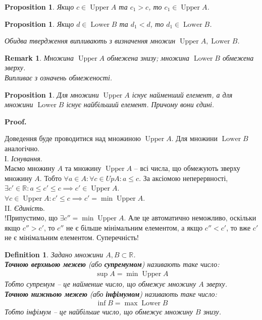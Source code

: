 \documentclass[a4paper, 14pt]{article}
\makeatletter
\def\qed{$\blacksquare$}
\theoremstyle{theoremdd}
\theoremstyle{theoremdd}
\newtheorem{definition}[theorem]{Definition}
\theoremstyle{theoremdd}
\theoremstyle{theoremdd}
\theoremstyle{theoremdd}
\newtheorem{proposition}[theorem]{Proposition}
\theoremstyle{theoremdd}
\newtheorem{remark}[theorem]{Remark}
\theoremstyle{theoremdd}
\theoremstyle{theoremdd}
\renewenvironment{proof}[1][Proof.\\]{\par
\pushQED{\hfill \qed}%
\normalfont \topsep6\p@\@plus6\p@\relax
\trivlist
\item\relax
{\bfseries
#1\@addpunct{.}}\hspace\labelsep\ignorespaces
}{%
\popQED\endtrivlist\@endpefalse
}
\DeclareMathOperator{\Up}{Upper}
\DeclareMathOperator{\Low}{Lower}
\makeatother
\begin{document}
	\begin{proposition}
	Якщо $c \in \Up A$ та $c_1 > c$, то $c_1 \in \Up A$.
	\end{proposition}
	
	\begin{proposition}
	Якщо $d \in \Low B$ та $d_1 < d$, то $d_1 \in \Low B$.
	\end{proposition}
	
	\textit{Обидва твердження випливають з визначення множин $\Up A, \Low B$.}
	
	\begin{remark}
	Множина $\Up A$ обмежена знизу; множина $\Low B$ обмежена зверху.\\
	\textit{Випливає з означень обмеженості.}
	\end{remark}
	
	\begin{proposition}
	Для множини $\Up A$ існує найменший елемент, а для множини $\Low B$ існує найбільший елемент. Причому вони єдині.
	\end{proposition}
	
	\begin{proof}
	Доведення буде проводитися над множиною $\Up A$. Для множини $\Low B$ аналогічно.\\
	І. \textit{Існування}.\\
	Маємо множину $A$ та множину $\Up A$ -- всі числа, що обмежують зверху множину $A$. Тобто $\forall a \in A: \forall c \in UpA: a \leq c$. За аксіомою неперервності, $\exists c' \in \mathbb{R}: a \leq c' \leq c \implies c' \in \Up A$.\\
	$\forall c \in \Up A: c' \leq c \implies c' = \min \Up A$.
	\bigskip \\
	II. \textit{Єдиність}.\\
	!Припустимо, що $\exists c'' = \min \Up A$. Але це автоматично неможливо, оскільки якщо $c'' > c'$, то $c''$ не є більше мінімальним елементом, а якщо $c'' < c'$, то вже $c'$ не є мінімальним елементом. Суперечність!
	\end{proof}
	
	\begin{definition} Задано множини $A,B \subset \mathbb{R}$.\\
	\textbf{Точною верхньою межею} (або \textbf{супремумом}) називають таке число:
	\begin{align*}
	\sup A = \min \Up A
	\end{align*}
	Тобто супремум -- це найменше число, що обмежує множину $A$ зверху.\\
	\textbf{Точною нижньою межею} (або \textbf{інфімумом}) називають таке число:
	\begin{align*}
	\inf B = \max \Low B
	\end{align*}
	Тобто інфімум -- це найбільше число, що обмежує множину $B$ знизу.
	\end{definition}
	
\end{document}
